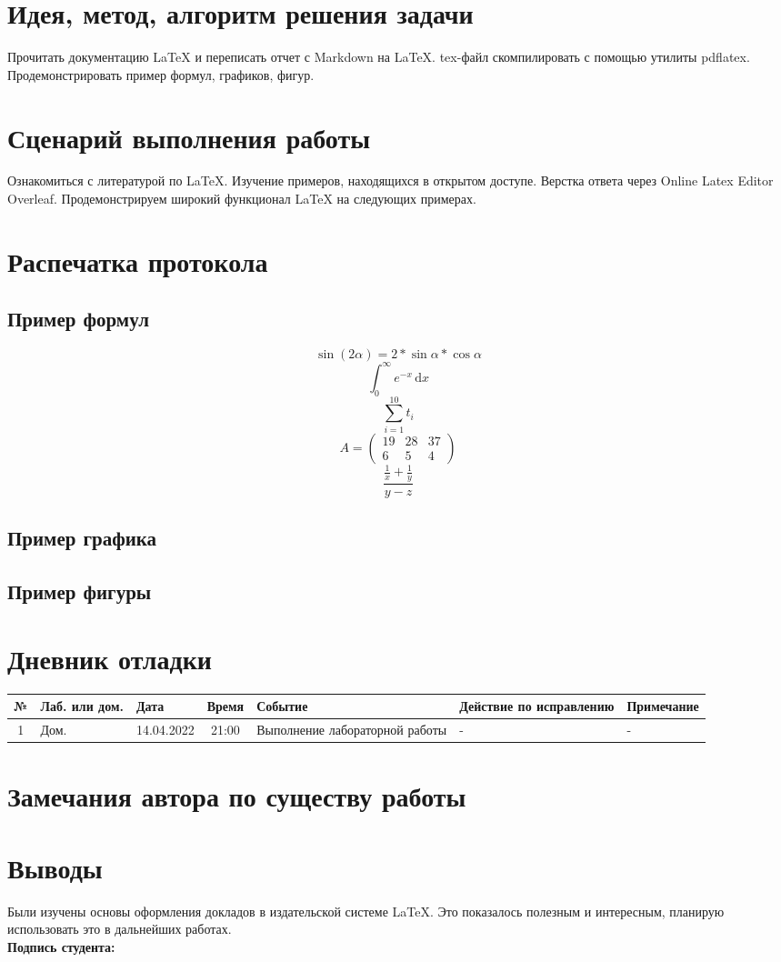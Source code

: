 \documentclass[12pt, letterpaper]{article}
\begin{document}
\section{Идея, метод, алгоритм решения задачи}
Прочитать документацию \LaTeX{} и переписать отчет с Markdown на \LaTeX{}. tex-файл скомпилировать с помощью утилиты pdflatex. Продемонстрировать пример формул, графиков, фигур. 
\section{Сценарий выполнения работы}
Ознакомиться с литературой по \LaTeX{}. Изучение примеров, находящихся в открытом доступе. Верстка ответа через Online Latex Editor Overleaf.
Продемонстрируем широкий функционал \LaTeX{} на следующих примерах.
\section{Распечатка протокола}
\subsection{Пример формул}
\[\sin (2 \alpha) = 2*\sin \alpha*\cos \alpha\]
\[\int_0^\infty e^{-x}\,\mathrm{d}x\]
\[\displaystyle\sum_{i=1}^{10} t_i\]
\[A=
\begin{pmatrix}
19 & 28 & 37\\
6 & 5 & 4
\end{pmatrix}\]
\[\frac{\frac{1}{x}+\frac{1}{y}}{y-z}\]
\subsection{Пример графика} 

\subsection{Пример фигуры} 
\section{Дневник отладки}
\begin{tabular}{|c|p{1cm}|p{2cm}|c|p{3 cm}|p{1.5 cm}|p{2.3 cm}|}
    \hline
    № & Лаб. или дом. & Дата & Время & Событие & Действие по исправлению & Примечание\\
    \hline
    1 & Дом. & 14.04.2022 & 21:00 & Выполнение лабораторной работы & - & -\\
    \hline
\end{tabular}
\section{Замечания автора по существу работы}

\section{Выводы}
Были изучены основы оформления докладов в издательской системе \LaTeX{}. Это показалось полезным и интересным, планирую использовать это в дальнейших работах.  \\
\flushright \textbf{Подпись студента:} \underline{\hspace{3cm}}
\end{document}

